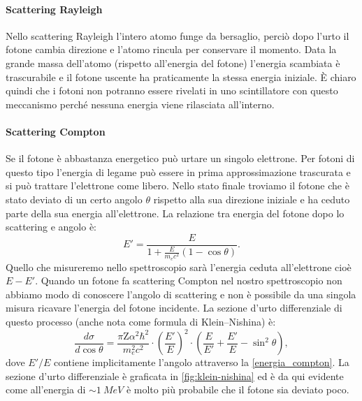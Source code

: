  \paragraph{Scattering Rayleigh}
 Nello scattering Rayleigh l'intero atomo funge da bersaglio, perciò dopo l'urto il fotone cambia direzione e l'atomo rincula per conservare il momento. Data la grande massa dell'atomo (rispetto all'energia del fotone) l'energia scambiata è trascurabile e il fotone uscente ha praticamente la stessa energia iniziale. \`E chiaro quindi che i fotoni non potranno essere rivelati in uno scintillatore con questo meccanismo perché nessuna energia viene rilasciata all'interno.
 
 \paragraph{Scattering Compton}
 Se il fotone è abbastanza energetico può urtare un singolo elettrone. Per fotoni di questo tipo l'energia di legame può essere in prima approssimazione trascurata e si può trattare l'elettrone come libero. Nello stato finale troviamo il fotone che è stato deviato di un certo angolo $\theta$ rispetto alla sua direzione iniziale e ha ceduto parte della sua energia all'elettrone. La relazione tra energia del fotone dopo lo scattering e angolo è:
 \begin{equation}
 \label{energia_compton} 
 E' = \frac{E}{1+\frac{E}{m_ec^2}(1-\cos{\theta})}.
 \end{equation}
 Quello che misureremo nello spettroscopio sarà l'energia ceduta all'elettrone cioè $E-E'$. Quando un fotone fa scattering Compton nel nostro spettroscopio non abbiamo modo di conoscere l'angolo di scattering e non è possibile da una singola misura ricavare l'energia del fotone incidente.
 La sezione d'urto differenziale di questo processo (anche nota come formula di Klein–Nishina) è:
 \begin{equation}
 \label{klein-nishina}
 \frac{d\sigma}{d\cos{\theta}} = \frac{\pi\text{Z}\alpha^2\hbar^2}{m_e^2c^2} \cdot\left(\frac{E'}{E}\right)^2 \cdot \left(\frac{E}{E'} + \frac{E'}{E} - \sin^2{\theta}\right),
 \end{equation}
 dove $E'/E$ contiene implicitamente l'angolo attraverso la \eqref{energia_compton}.
 La sezione d'urto differenziale è graficata in \autoref{fig:klein-nishina}
 ed è da qui evidente come all'energia di $\sim \SI{1}{MeV}$ è molto più probabile che il fotone sia deviato poco. 
 
